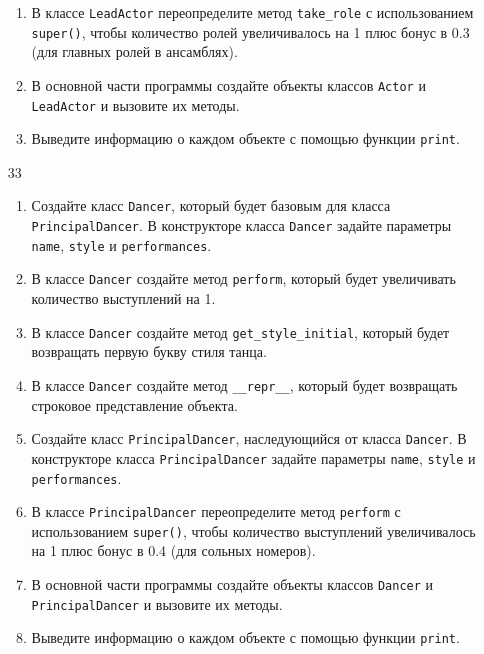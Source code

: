 \begin{enumerate}
\begin{enumerate}[leftmargin=*]
    \item В классе \texttt{LeadActor} переопределите метод \texttt{take\_role} с использованием \texttt{super()}, чтобы количество ролей увеличивалось на 1 плюс бонус в 0.3 (для главных ролей в ансамблях).
    
    \item В основной части программы создайте объекты классов \texttt{Actor} и \texttt{LeadActor} и вызовите их методы.
    
    \item Выведите информацию о каждом объекте с помощью функции \texttt{print}.
\end{enumerate}

\item[33] 
\begin{enumerate}[leftmargin=*]
    \item Создайте класс \texttt{Dancer}, который будет базовым для класса \texttt{PrincipalDancer}. В конструкторе класса \texttt{Dancer} задайте параметры \texttt{name}, \texttt{style} и \texttt{performances}.
    
    \item В классе \texttt{Dancer} создайте метод \texttt{perform}, который будет увеличивать количество выступлений на 1.
    
    \item В классе \texttt{Dancer} создайте метод \texttt{get\_style\_initial}, который будет возвращать первую букву стиля танца.
    
    \item В классе \texttt{Dancer} создайте метод \texttt{\_\_repr\_\_}, который будет возвращать строковое представление объекта.
    
    \item Создайте класс \texttt{PrincipalDancer}, наследующийся от класса \texttt{Dancer}. В конструкторе класса \texttt{PrincipalDancer} задайте параметры \texttt{name}, \texttt{style} и \texttt{performances}.
    
    \item В классе \texttt{PrincipalDancer} переопределите метод \texttt{perform} с использованием \texttt{super()}, чтобы количество выступлений увеличивалось на 1 плюс бонус в 0.4 (для сольных номеров).
    
    \item В основной части программы создайте объекты классов \texttt{Dancer} и \texttt{PrincipalDancer} и вызовите их методы.
    
    \item Выведите информацию о каждом объекте с помощью функции \texttt{print}.
\end{enumerate}


\end{enumerate}
